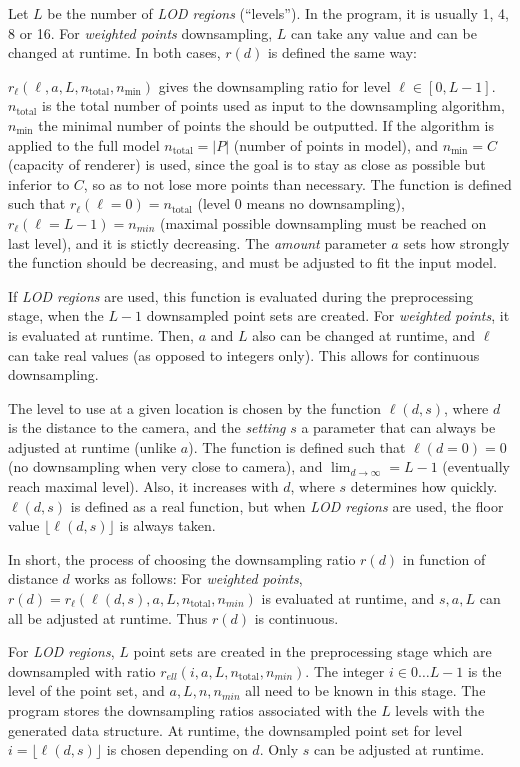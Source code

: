 \documentclass[a4paper,10pt,abstracton,notitlepage]{scrreprt}
\begin{document}
Let $L$ be the number of \emph{LOD regions} (``levels''). In the program, it is usually 1, 4, 8 or 16. For \emph{weighted points} downsampling, $L$ can take any value and can be changed at runtime. In both cases, $r(d)$ is defined the same way:

$r_{\ell}(\ell, a, L, n_{\text{total}}, n_{\min})$ gives the downsampling ratio for level $\ell \in [0, L-1]$. $n_{\text{total}}$ is the total number of points used as input to the downsampling algorithm, $n_{\min}$ the minimal number of points the should be outputted. If the algorithm is applied to the full model $n_{\text{total}} = |P|$ (number of points in model), and $n_{\min} = C$ (capacity of renderer) is used, since the goal is to stay as close as possible but inferior to $C$, so as to not lose more points than necessary. The function is defined such that $r_{\ell}(\ell = 0) = n_{\text{total}}$ (level 0 means no downsampling), $r_{\ell}(\ell = L-1) = n_{min}$ (maximal possible downsampling must be reached on last level), and it is stictly decreasing. The \emph{amount} parameter $a$ sets how strongly the function should be decreasing, and must be adjusted to fit the input model.

If \emph{LOD regions} are used, this function is evaluated during the preprocessing stage, when the $L-1$ downsampled point sets are created. For \emph{weighted points}, it is evaluated at runtime. Then, $a$ and $L$ also can be changed at runtime, and $\ell$ can take real values (as opposed to integers only). This allows for continuous downsampling.

The level to use at a given location is chosen by the function $\ell(d, s)$, where $d$ is the distance to the camera, and the \emph{setting} $s$ a parameter that can always be adjusted at runtime (unlike $a$). The function is defined such that $\ell(d = 0) = 0$ (no downsampling when very close to camera), and $\lim_{d \rightarrow \infty} = L-1$ (eventually reach maximal level). Also, it increases with $d$, where $s$ determines how quickly. $\ell(d, s)$ is defined as a real function, but when \emph{LOD regions} are used, the floor value $\lfloor \ell(d, s) \rfloor$ is always taken.

In short, the process of choosing the downsampling ratio $r(d)$ in function of distance $d$ works as follows: For \emph{weighted points}, $r(d) = r_{\ell}(\ell(d, s), a, L, n_{\text{total}}, n_{min})$ is evaluated at runtime, and $s, a, L$ can all be adjusted at runtime. Thus $r(d)$ is continuous.

For \emph{LOD regions}, $L$ point sets are created in the preprocessing stage which are downsampled with ratio $r_{ell}(i, a, L, n_{\text{total}}, n_{min})$. The integer $i \in 0 \hdots L-1$ is the level of the point set, and $a, L, n, n_{min}$ all need to be known in this stage. The program stores the downsampling ratios associated with the $L$ levels with the generated data structure. At runtime, the downsampled point set for level $i = \lfloor \ell(d, s) \rfloor$ is chosen depending on $d$. Only $s$ can be adjusted at runtime.
\end{document}
